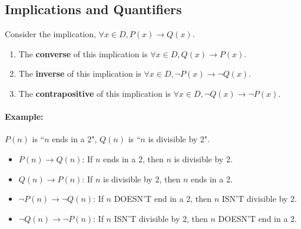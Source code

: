     \hrulefill

    \subsection{Implications and Quantifiers}

        \begin{introNOHEAD}
            Consider the implication, $\forall x \in D, P(x) \to Q(x)$.

            \begin{enumerate}
                \item The \textbf{converse} of this implication is $\forall x \in D, Q(x) \to P(x)$.
                \item The \textbf{inverse} of this implication is $\forall x \in D, \neg P(x) \to \neg Q(x)$.
                \item The \textbf{contrapositive} of this implication is $\forall x \in D, \neg Q(x) \to \neg P(x)$.
            \end{enumerate}

            \paragraph{Example:} $P(n)$ is ``$n$ ends in a 2", $Q(n)$ is ``$n$ is divisible by 2".

            \begin{itemize}
                \item   $P(n) \to Q(n)$: If $n$ ends in a 2, then $n$ is divisible by 2.
                \item   $Q(n) \to P(n)$: If $n$ is divisible by 2, then $n$ ends in a 2.
                \item   $\neg P(n) \to \neg Q(n)$: If $n$ DOESN'T end in a 2, then $n$ ISN'T divisible by 2.
                \item   $\neg Q(n) \to \neg P(n)$: If $n$ ISN'T divisible by 2, then $n$ DOESN'T end in a 2.
            \end{itemize}
        \end{introNOHEAD}

    \newpage

